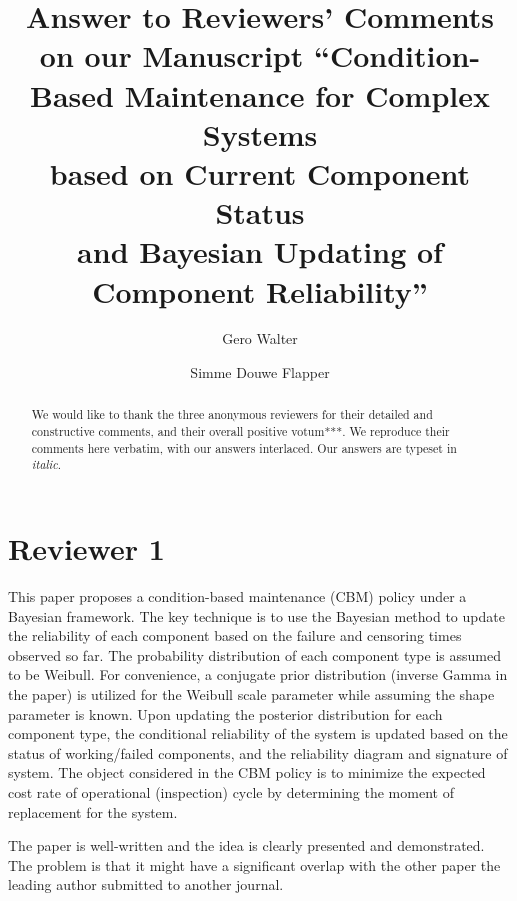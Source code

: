 \documentclass[authoryear]{elsarticle}
\begin{document}

\begin{frontmatter}
\title{Answer to Reviewers' Comments on our Manuscript
``Condition-Based Maintenance for Complex Systems\\ based on Current Component Status\\ and Bayesian Updating of Component Reliability''}

\author[tue]{Gero Walter}
\author[tue]{Simme Douwe Flapper}

\address[tue]{School of Industrial Engineering, Eindhoven University of Technology, Eindhoven, Netherlands}


\begin{abstract}
We would like to thank the three anonymous reviewers for their detailed and constructive comments,
and their overall positive votum***.
We reproduce their comments here verbatim, with our answers interlaced.
Our answers are typeset in \emph{italic}.
\end{abstract}
\end{frontmatter}


\section*{Reviewer 1}

This paper proposes a condition-based maintenance (CBM) policy under a Bayesian framework. The key technique is to use the Bayesian method to update the reliability of each component based on the failure and censoring times observed so far. The probability distribution of each component type is assumed to be Weibull. For convenience, a conjugate prior distribution (inverse Gamma in the paper) is utilized for the Weibull scale parameter while assuming the shape parameter is known. Upon updating the posterior distribution for each component type, the conditional reliability of the system is updated based on the status of working/failed components, and the reliability diagram and signature of system. The object considered in the CBM policy is to minimize the expected cost rate of operational (inspection) cycle by determining the moment of replacement for the system.

The paper is well-written and the idea is clearly presented and demonstrated.
The problem is that it might have a significant overlap with the other paper the leading author submitted to another journal.
\end{document}
